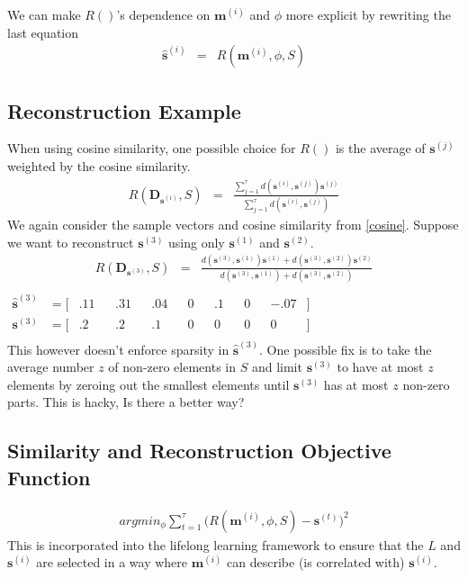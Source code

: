 \documentclass{article} %
\newcommand{\Mt}[1]{\textbf{m}^{(#1)}}
\newcommand{\st}[1]{\textbf{s}^{(#1)}}
\newcommand{\sthat}[1]{\hat{\textbf{s}}^{(#1)}}
\newcommand{\pairsim}[1]{d(#1)}
\newcommand{\pairset}[1]{\bm{D}_{#1}}
\newcommand{\reveng}[1]{R(#1)}
\begin{document}
We can make $\reveng{}$'s dependence on $\Mt{i}$ and $\phi$ more explicit by rewriting the last equation 
\begin{eqnarray*} 
	\sthat{i} &=& \reveng{ \Mt{i}, \phi,  S  } 
\end{eqnarray*}

\subsection{Reconstruction Example}
When using cosine similarity, one possible choice for $\reveng{  }$ is the average of $\st{j}$ weighted by the cosine similarity.
\begin{eqnarray}
	\reveng{ \pairset{\st{i}}, S  }&=& \frac{\sum_{j=1}^{\tau} \pairsim{\st{i},\st{j}}\st{j}}   {\sum_{j=1}^{\tau} \pairsim{\st{i},\st{j} }}
\end{eqnarray}
We again consider the sample vectors and cosine similarity from \ref{cosine}. Suppose we want to reconstruct $\st{3}$ using only $\st{1}$ and $\st{2}$. 
\begin{eqnarray*}
	\reveng{ \pairset{\st{3}}, S  }&=&  \frac{  \pairsim{\st{3},\st{1}} \st{1} + \pairsim{\st{3},\st{2}} \st{2}   } { \pairsim{\st{3},\st{1}} +  \pairsim{\st{3},\st{2}}} \\
\end{eqnarray*}
\begin{align*}
	\sthat{3} &= [&.11& &.31& &.04& &0& &.1& &0& &-.07& ]&&&&&&&&&&&&&&&&&&\\
	\st{3} &= [&.2&	&.2& 	&.1&	&0&	&0&	&0&   &0& ]&&&&&&&&&&&&&&&&&&\\
\end{align*}
This however doesn't enforce sparsity in $\sthat{3}$. One possible fix is to take the average number $z$ of non-zero elements in $S$ and limit $\st{3} $ to have at most $z$ elements by zeroing out the smallest elements until $\st{3} $ has at most $z$ non-zero parts. This is hacky, Is there a better way?


\subsection{Similarity and Reconstruction Objective Function}
\begin{gather}
	argmin_{\phi} \sum_{t=1}^{\tau} \big( \reveng{ \Mt{i}, \phi,  S  }- \st{t}  \big)^2 
\end{gather}
This is incorporated into the lifelong learning framework to ensure that the $L$ and $\st{i}$ are selected in a way where $\Mt{i}$ can describe (is correlated with) $\st{i}$.
\end{document}
